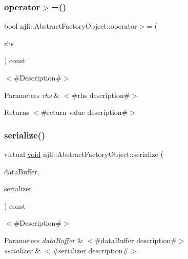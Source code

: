 \subsubsection{\texorpdfstring{operator$>$=()}{operator>=()}}
{\footnotesize\ttfamily bool njli\+::\+Abstract\+Factory\+Object\+::operator$>$= (\begin{DoxyParamCaption}\item[{const \mbox{\hyperlink{classnjli_1_1_abstract_factory_object}{Abstract\+Factory\+Object}} \&}]{rhs }\end{DoxyParamCaption}) const}

$<$\#\+Description\#$>$


\begin{DoxyParams}{Parameters}
{\em rhs} & $<$\#rhs description\#$>$\\
\hline
\end{DoxyParams}
\begin{DoxyReturn}{Returns}
$<$\#return value description\#$>$ 
\end{DoxyReturn}
\mbox{\label{classnjli_1_1_abstract_factory_object_aad2fbe86fb3bdecf02918a96b9c57976}} 
\subsubsection{\texorpdfstring{serialize()}{serialize()}}
{\footnotesize\ttfamily virtual \mbox{\hyperlink{_thread_8h_af1e856da2e658414cb2456cb6f7ebc66}{void}} njli\+::\+Abstract\+Factory\+Object\+::serialize (\begin{DoxyParamCaption}\item[{\mbox{\hyperlink{_thread_8h_af1e856da2e658414cb2456cb6f7ebc66}{void}} $\ast$}]{data\+Buffer,  }\item[{bt\+Serializer $\ast$}]{serializer }\end{DoxyParamCaption}) const\hspace{0.3cm}{\ttfamily [pure virtual]}}

$<$\#\+Description\#$>$


\begin{DoxyParams}{Parameters}
{\em data\+Buffer} & $<$\#data\+Buffer description\#$>$ \\
\hline
{\em serializer} & $<$\#serializer description\#$>$ \\
\hline
\end{DoxyParams}


